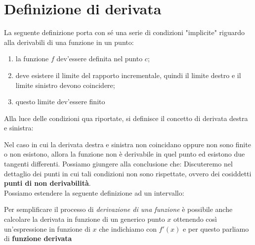 \documentclass{report}
\begin{document}
\section{Definizione di derivata}
\par\smallskip\noindent La seguente definizione porta con sé una serie di condizioni "implicite" riguardo alla derivabili di una funzione in un punto:
\begin{enumerate}[label=\protect\circled{\arabic*}]
	\item la funzione $f$ dev'essere definita nel punto $c$;
	\item deve esistere il limite del rapporto incrementale, quindi il limite destro e il limite sinistro devono coincidere;
	\item questo limite dev'essere finito
\end{enumerate}
Alla luce delle condizioni qua riportate, si definisce il concetto di derivata destra e sinistra:
\dfn{Derivata destra e sinistra}{Data una funzione $f(x)$ definita nell'intervallo $[a;b]$ e dato il punto $c$ con $c \in ]a;b[$ si definisce:
\begin{align*}
&\text{la \textbf{derivata sinistra} come} & &\text{la \textbf{derivata destra} come:}
\end{align*}
\begin{align}
&f'_{-}(c)=\lim_{h \to 0^{+}} \frac{f(c+h)-f(c)}{h} & &f'_{+}(c) = \lim_{h \to 0^{-}} \frac{f(c+h)-f(c)}{h}
\end{align}}
\par\noindent\smallskip Nel caso in cui la derivata destra e sinistra non coincidano oppure non sono finite o non esistono, allora la funzione non è derivabile in quel punto ed esistono due tangenti differenti. Possiamo giungere alla conclusione che:
\noindent Discuteremo nel dettaglio dei punti in cui tali condizioni non sono rispettate, ovvero dei cosiddetti \textbf{punti di non derivabilità}. \\
Possiamo estendere la seguente definizione ad un intervallo:
\par\smallskip\noindent Per semplificare il processo di \emph{derivazione di una funzione} è possibile anche calcolare la derivata in funzione di un generico punto $x$ ottenendo così un'espressione in funzione di $x$ che indichiamo con $f'(x)$ e per questo parliamo di \textbf{funzione derivata}
\end{document}
